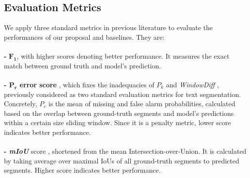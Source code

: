 \documentclass[runningheads]{llncs}
\begin{document}
\subsection{Evaluation Metrics}
We apply three standard metrics in previous literature to evaluate the performances of our proposal and baselines. They are:\\
\vspace{-2ex} \\
\textbf{-} $\boldsymbol{F_1}$, with higher scores denoting better performance. It measures the exact match between ground truth and model's prediction.\\
\vspace{-2ex} \\
\textbf{- $\boldsymbol{P_r}$ error score} \cite{georgescul-etal-2006-analysis}, which fixes the inadequacies %
of $P_k$ \cite{Beeferman1999} and \textit{WindowDiff} \cite{pevzner-hearst-2002-critique}, previously considered as two standard evaluation metrics for text segmentation. Concretely, $P_r$ is the mean of missing and false alarm probabilities, calculated based on the overlap between ground-truth segments and model's predictions within a certain size sliding window. Since it is a penalty metric, lower score indicates better performance. \\
\vspace{-2ex} \\
\textbf{- \textit{mIoU}} score \cite{zhu-etal-2022-end}, shortened from the mean Intersection-over-Union. It is calculated by taking average over maximal IoUs of all ground-truth segments to predicted segments. Higher score indicates better performance. 
\end{document}
